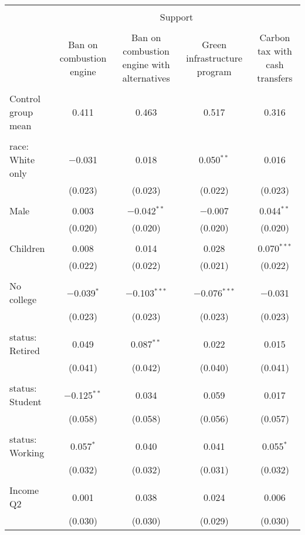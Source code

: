 
\begin{tabular}{@{\extracolsep{5pt}}lcccc} 
\\[-1.8ex]\hline 
\hline \\[-1.8ex] 
 & \multicolumn{4}{c}{Support} \\ 
\cline{2-5} 
\\[-1.8ex] & Ban on combustion engine & Ban on combustion engine with alternatives & Green infrastructure program & Carbon tax with cash transfers \\ 
\hline \\[-1.8ex] 
 Control group mean & 0.411 & 0.463 & 0.517 & 0.316  \\ \hline \\[-1.8ex] race: White only & $-$0.031 & 0.018 & 0.050$^{**}$ & 0.016 \\ 
  & (0.023) & (0.023) & (0.022) & (0.023) \\ 
  & & & & \\ 
 Male & 0.003 & $-$0.042$^{**}$ & $-$0.007 & 0.044$^{**}$ \\ 
  & (0.020) & (0.020) & (0.020) & (0.020) \\ 
  & & & & \\ 
 Children & 0.008 & 0.014 & 0.028 & 0.070$^{***}$ \\ 
  & (0.022) & (0.022) & (0.021) & (0.022) \\ 
  & & & & \\ 
 No college & $-$0.039$^{*}$ & $-$0.103$^{***}$ & $-$0.076$^{***}$ & $-$0.031 \\ 
  & (0.023) & (0.023) & (0.023) & (0.023) \\ 
  & & & & \\ 
 status: Retired & 0.049 & 0.087$^{**}$ & 0.022 & 0.015 \\ 
  & (0.041) & (0.042) & (0.040) & (0.041) \\ 
  & & & & \\ 
 status: Student & $-$0.125$^{**}$ & 0.034 & 0.059 & 0.017 \\ 
  & (0.058) & (0.058) & (0.056) & (0.057) \\ 
  & & & & \\ 
 status: Working & 0.057$^{*}$ & 0.040 & 0.041 & 0.055$^{*}$ \\ 
  & (0.032) & (0.032) & (0.031) & (0.032) \\ 
  & & & & \\ 
 Income Q2 & 0.001 & 0.038 & 0.024 & 0.006 \\ 
  & (0.030) & (0.030) & (0.029) & (0.030) \\ 

\end{tabular}
